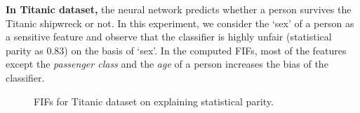 \textbf{In Titanic dataset,} the neural network predicts whether a person survives the Titanic shipwreck or not. In this experiment, we consider the `sex' of a person as a sensitive feature and observe that the classifier is highly unfair (statistical parity as $ 0.83 $) on the basis of `sex'. In the computed FIFs, most of the features except the \textit{passenger class} and the \textit{age} of a person increases the bias of the classifier.

\begin{figure}[h!]
	\begin{minipage}{0.45\textwidth}
		\centering
	\end{minipage}
	\begin{minipage}{0.5\textwidth}
		\centering
	\end{minipage}
	\vspace{-0.2em}
	\caption{FIFs for Titanic dataset on explaining statistical parity.}\label{fig:individual_vs_intersectional_influence_titanic}
	
\end{figure}
